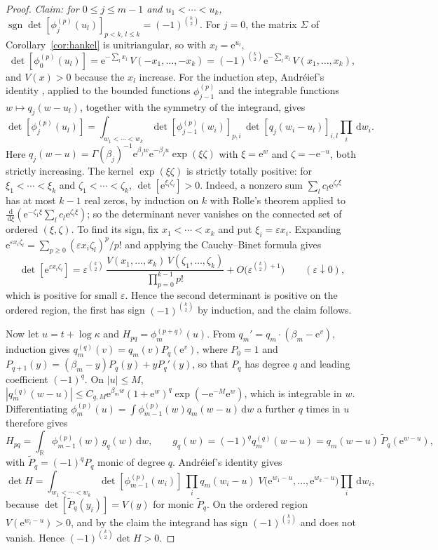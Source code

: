 \documentclass[twoside,10pt]{article}
\numberwithin{equation}{section}
\theoremstyle{slbody}
\theoremstyle{remark}
\newcommand{\dd}{\,\mathrm d}
\newcommand{\sgn}{\operatorname{sgn}}
\newcommand{\e}{\mathrm e}
\begin{document}
\begin{proof}
\emph{Claim: for \(0\leq j\leq m-1\) and \(u_1<\cdots<u_k\),}
\(\sgn\det[\phi_j^{(p)}(u_l)]_{p<k,\,l\leq k}=(-1)^{\binom k2}\).
For \(j=0\), the matrix \(\Sigma\) of Corollary~\ref{cor:hankel} is
unitriangular, so with \(x_l=\e^{u_l}\),
\[
\det[\phi_0^{(p)}(u_l)]
=\e^{-\sum_lx_l}\,V(-x_1,\ldots,-x_k)
=(-1)^{\binom k2}\e^{-\sum_lx_l}\,V(x_1,\ldots,x_k),
\]
and \(V(x)>0\) because the \(x_l\) increase.  For the induction step,
Andr\'eief's identity \cite{Andreief1886,Forrester2019}, applied to the
bounded functions \(\phi_{j-1}^{(p)}\) and the integrable functions
\(w\mapsto q_j(w-u_l)\), together with the symmetry of the integrand,
gives
\[
\det[\phi_j^{(p)}(u_l)]
=\int_{w_1<\cdots<w_k}
\det[\phi_{j-1}^{(p)}(w_i)]_{p,i}\,
\det[q_j(w_i-u_l)]_{i,l}\prod_i\dd w_i .
\]
Here \(q_j(w-u)=\Gamma(\beta_j)^{-1}\e^{\beta_jw}\e^{-\beta_ju}
\exp(\xi\zeta)\) with \(\xi=\e^w\) and \(\zeta=-\e^{-u}\), both strictly
increasing.  The kernel \(\exp(\xi\zeta)\) is strictly totally positive:
for \(\xi_1<\cdots<\xi_k\) and \(\zeta_1<\cdots<\zeta_k\),
\(\det[\e^{\xi_i\zeta_l}]>0\).  Indeed, a nonzero sum
\(\sum_lc_l\e^{\zeta_l\xi}\) has at most \(k-1\) real zeros, by induction
on \(k\) with Rolle's theorem applied to
\(\frac{\dd}{\dd\xi}(\e^{-\zeta_1\xi}\sum_lc_l\e^{\zeta_l\xi})\); so the
determinant never vanishes on the connected set of ordered
\((\xi,\zeta)\).  To find its sign, fix \(x_1<\cdots<x_k\) and put
\(\xi_i=\varepsilon x_i\).  Expanding
\(\e^{\varepsilon x_i\zeta_l}=\sum_{p\geq0}(\varepsilon x_i\zeta_l)^p/p!\) and
applying the Cauchy--Binet formula gives
\[
\det[\e^{\varepsilon x_i\zeta_l}]
=\varepsilon^{\binom k2}\,
\frac{V(x_1,\ldots,x_k)\,V(\zeta_1,\ldots,\zeta_k)}{\prod_{p=0}^{k-1}p!}
+O\bigl(\varepsilon^{\binom k2+1}\bigr)
\qquad(\varepsilon\downarrow0),
\]
which is positive for small \(\varepsilon\).  Hence the second determinant is
positive on the ordered region, the first has sign \((-1)^{\binom k2}\) by
induction, and the claim follows.

Now let \(u=t+\log\kappa\) and \(H_{pq}=\phi_m^{(p+q)}(u)\).  From
\(q_m'=q_m\cdot(\beta_m-\e^v)\), induction gives
\(q_m^{(q)}(v)=q_m(v)P_q(\e^v)\), where \(P_0=1\) and
\(P_{q+1}(y)=(\beta_m-y)P_q(y)+yP_q'(y)\), so that \(P_q\) has degree
\(q\) and leading coefficient \((-1)^q\).  On \(|u|\leq M\),
\(|q_m^{(q)}(w-u)|\leq C_{q,M}\e^{\beta_mw}(1+\e^w)^q\exp(-\e^{-M}\e^w)\),
which is integrable in \(w\).  Differentiating
\(\phi_m^{(p)}(u)=\int\phi_{m-1}^{(p)}(w)q_m(w-u)\dd w\) a further \(q\)
times in \(u\) therefore gives
\[
H_{pq}=\int_{\mathbb R}\phi_{m-1}^{(p)}(w)\,g_q(w)\dd w,
\qquad
g_q(w)=(-1)^qq_m^{(q)}(w-u)=q_m(w-u)\,\widetilde P_q(\e^{w-u}),
\]
with \(\widetilde P_q=(-1)^qP_q\) monic of degree \(q\).  Andr\'eief's
identity gives
\[
\det H=\int_{w_1<\cdots<w_k}
\det[\phi_{m-1}^{(p)}(w_i)]\,
\prod_iq_m(w_i-u)\;V\bigl(\e^{w_1-u},\ldots,\e^{w_k-u}\bigr)
\prod_i\dd w_i ,
\]
because \(\det[\widetilde P_q(y_i)]=V(y)\) for monic \(\widetilde P_q\).
On the ordered region \(V(\e^{w_i-u})>0\), and by the claim the
integrand has sign \((-1)^{\binom k2}\) and does not vanish.  Hence
\((-1)^{\binom k2}\det H>0\).
\end{proof}
\end{document}
